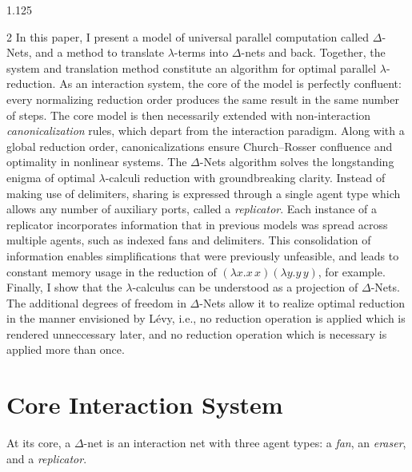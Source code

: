 \documentclass[10pt]{article}
\begin{document}
\begin{spacing}{1.125}
\begin{multicols}{2}
In this paper, I present a model of universal parallel computation called {$\Delta$-Nets}, and a method to translate \mbox{$\lambda$-terms} into \mbox{$\Delta$-nets} and back. Together, the system and translation method constitute an algorithm for optimal parallel \mbox{$\lambda$-reduction}.
As an interaction system, the core of the model is perfectly confluent: every normalizing reduction order produces the same result in the same number of steps.
The core model is then necessarily extended with non-interaction \emph{canonicalization} rules, which depart from the interaction paradigm.
Along with a global reduction order, canonicalizations ensure Church--Rosser confluence and optimality in nonlinear systems.
The \mbox{$\Delta$-Nets} algorithm solves the longstanding enigma of optimal \mbox{$\lambda$-calculi} reduction with groundbreaking clarity.
Instead of making use of delimiters, sharing is expressed through a single agent type which allows any number of auxiliary ports, called a \textit{replicator}.
Each instance of a replicator incorporates information that in previous models was spread across multiple agents, such as indexed fans and delimiters. This consolidation of information enables simplifications that were previously unfeasible, and leads to constant memory usage in the reduction of $(\lambda x.x\,x)(\lambda y.y\,y)$, for example.
%
Finally, I show that the \mbox{$\lambda$-calculus} can be understood as a projection of \mbox{$\Delta$-Nets}. The additional degrees of freedom in \mbox{$\Delta$-Nets} allow it to realize optimal reduction in the manner envisioned by Lévy, i.e., no reduction operation is applied which is rendered unneccessary later, and no reduction operation which is necessary is applied more than once.

\section{Core Interaction System}

At its core, a \mbox{$\Delta$-net} is an interaction net with three agent types: a \textit{fan}, an \textit{eraser}, and a \textit{replicator}.


\end{multicols}
\end{spacing}
\end{document}
